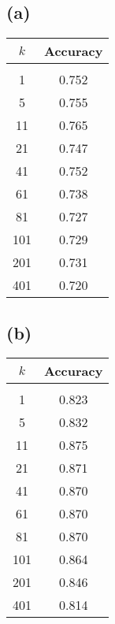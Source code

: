 \documentclass[12pt]{article}
\begin{document}
	\subsection*{(a)}
	\begin{tabular}{c | c}
		$k$ & Accuracy \\
		\hline & \\
		1 & 0.752 \\
		5 & 0.755 \\
		11 & 0.765 \\
		21 & 0.747 \\
		41 & 0.752 \\
		61 & 0.738 \\
		81 & 0.727 \\
		101 & 0.729 \\
		201 & 0.731 \\
		401 & 0.720 \\
	\end{tabular}

	\subsection*{(b)}
	\begin{tabular}{c | c}
		$k$ & Accuracy \\
		\hline & \\
		1 & 0.823 \\
		5 & 0.832 \\
		11 & 0.875 \\
		21 & 0.871 \\
		41 & 0.870 \\
		61 & 0.870 \\
		81 & 0.870 \\
		101 & 0.864 \\
		201 & 0.846 \\
		401 & 0.814
	\end{tabular}
\end{document}
